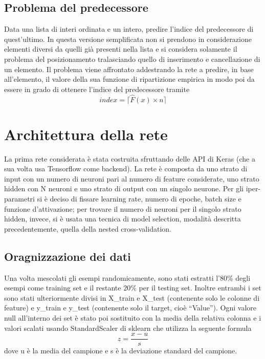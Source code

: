 \documentclass[12pt]{report}
\begin{document}
\subsection{Problema del predecessore}\label{probPred}
Data una lista di interi ordinata e un intero, predire l'indice del predecessore di quest'ultimo. In questa versione semplificata non si prendono in considerazione elementi diversi da quelli già presenti nella lista e si considera solamente il problema del posizionamento tralasciando quello di inserimento e cancellazione di un elemento.
Il problema viene affrontato addestrando la rete a predire, in base all'elemento, il valore della sua funzione di ripartizione empirica in modo poi da essere in grado di ottenere l'indice del predecessore tramite $$index=\lceil\hat{F}(x)\times n\rceil$$

\section{Architettura della rete}
La prima rete considerata è stata costruita sfruttando delle API di Keras (che a sua volta usa Tensorflow come backend). La rete è composta da uno strato di input con un numero di neuroni pari al numero di feature considerate, uno strato hidden con N neuroni e uno strato di output con un singolo neurone. Per gli iper-parametri si è deciso di fissare learning rate, numero di epoche, batch size e funzione d'attivazione; per trovare il numero di neuroni per il singolo strato hidden, invece, si è usata una tecnica di model selection, modalità descritta precedentemente, quella della nested cross-validation.

\subsection{Oragnizzazione dei dati}
Una volta mescolati gli esempi randomicamente, sono stati estratti l'80\% degli esempi come training set e il restante 20\% per il testing set. Inoltre entrambi i set sono stati ulteriormente divisi in X\_train e X\_test (contenente solo le colonne di feature) e y\_train e y\_test (contenente solo il target, cioè “Value”). Ogni valore null all’interno dei set è stato poi sostituito con la media della relativa colonna e i valori scalati usando StandardScaler di sklearn che utilizza la seguente formula
$$z = \frac{x - u}{s}$$ 
dove u è la media del campione e s è la deviazione standard del campione.
\end{document}
